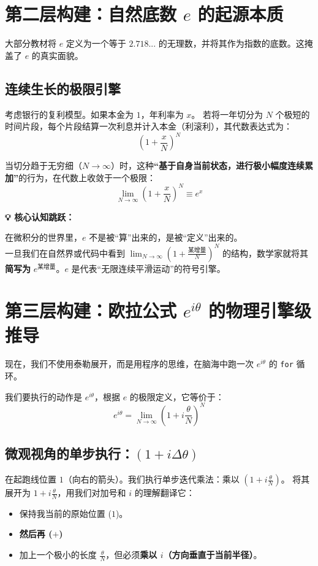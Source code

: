 \documentclass[12pt, a4paper]{article}
\newenvironment{insight}{
    \def\FrameCommand{\fboxsep=1em\colorbox{graybg}}
    \MakeFramed{\advance\hsize-\width\FrameRestore}
    \textbf{\textcolor{primary}{\large 💡 核心认知跳跃：}} \par\vspace{0.5em}
}{
    \endMakeFramed
}
\begin{document}
\section{第二层构建：自然底数 $e$ 的起源本质}

大部分教材将 $e$ 定义为一个等于 $2.718...$ 的无理数，并将其作为指数的底数。这掩盖了 $e$ 的真实面貌。

\subsection{连续生长的极限引擎}
考虑银行的复利模型。如果本金为 $1$，年利率为 $x$。
若将一年切分为 $N$ 个极短的时间片段，每个片段结算一次利息并计入本金（利滚利），其代数表达式为：
$$ \left(1 + \frac{x}{N}\right)^N $$

当切分趋于无穷细（$N \to \infty$）时，这种\textbf{“基于自身当前状态，进行极小幅度连续累加”}的行为，在代数上收敛于一个极限：
\begin{equation}
    \lim_{N \to \infty} \left(1 + \frac{x}{N}\right)^N \equiv e^x
\end{equation}

\begin{insight}
    在微积分的世界里，$e$ 不是被“算”出来的，是被“定义”出来的。\\
    一旦我们在自然界或代码中看到 $\lim_{N \to \infty} (1 + \frac{\text{某增量}}{N})^N$ 的结构，数学家就将其\textbf{简写为} $e^{\text{某增量}}$。$e$ 是代表“无限连续平滑运动”的符号引擎。
\end{insight}

\section{第三层构建：欧拉公式 $e^{i\theta}$ 的物理引擎级推导}

现在，我们不使用泰勒展开，而是用程序的思维，在脑海中跑一次 $e^{i\theta}$ 的 \texttt{for} 循环。

我们要执行的动作是 $e^{i\theta}$，根据 $e$ 的极限定义，它等价于：
\begin{equation}
    e^{i\theta} = \lim_{N \to \infty} \left(1 + i\frac{\theta}{N}\right)^N
\end{equation}

\subsection{微观视角的单步执行：$(1 + i\Delta\theta)$}
在起跑线位置 $1$（向右的箭头）。我们执行单步迭代乘法：乘以 $(1 + i\frac{\theta}{N})$。
将其展开为 $1 + i\frac{\theta}{N}$，用我们对加号和 $i$ 的理解翻译它：
\begin{itemize}
    \item 保持我当前的原始位置 ($1$)。
    \item \textbf{然后再 ($+$)}
    \item 加上一个极小的长度 $\frac{\theta}{N}$，但必须\textbf{乘以 $i$（方向垂直于当前半径）}。
\end{itemize}
\end{document}
